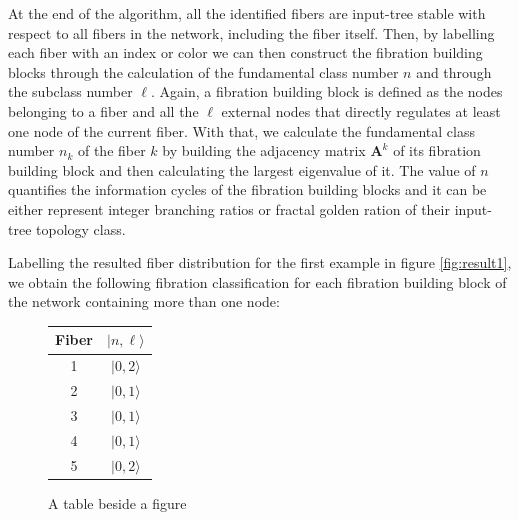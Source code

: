 \documentclass[12pt]{diazessay} %
\begin{document}
At the end of the algorithm, all the identified fibers are input-tree stable with respect to all fibers in the network, including the fiber itself. Then, by labelling each fiber with an index or color we can then construct the fibration building blocks through the calculation of the fundamental class number $n$ and through the subclass number $\ell$. Again, a fibration building block is defined as the nodes belonging to a fiber and all the $\ell$ external nodes that directly regulates at least one node of the current fiber. With that, we calculate the fundamental class number $n_k$ of the fiber $k$ by building the adjacency matrix $\mathbf{A}^{k}$ of its fibration building block and then calculating the largest eigenvalue of it. The value of $n$ quantifies the information cycles of the fibration building blocks and it can be either represent integer branching ratios or fractal golden ration of their input-tree topology class.

Labelling the resulted fiber distribution for the first example in figure \ref{fig:result1}, we obtain the following fibration classification for each fibration building block of the network containing more than one node:

\begin{figure}[!ht]
    \centering
    \qquad
    \begin{tabular}[b]{cc}\hline
      Fiber & $| n, \ell \rangle$  \\ \hline
      1 & $| 0, 2 \rangle$ \\
      2 & $| 0, 1 \rangle$ \\
      3 & $| 0, 1 \rangle$ \\ 
      4 & $| 0, 1 \rangle$ \\
      5 & $| 0, 2 \rangle$ \\ \hline
	\end{tabular}
    \caption{A table beside a figure}
\end{figure}
\end{document}
